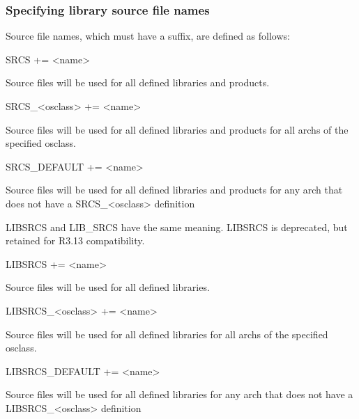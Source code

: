 \subsubsection{Specifying library source file names}

Source file names, which must have a suffix, are defined as follows:

\begin{description}\item {}SRCS += \textless{}name\textgreater{}

\end{description}Source files will be used for all defined libraries and products.

\begin{description}\item SRCS\_\textless{}osclass\textgreater{} += \textless{}name\textgreater{}

\end{description}Source files will be used for all defined libraries and products for all archs of the specified osclass.

\begin{description}\item SRCS\_DEFAULT += \textless{}name\textgreater{}

\end{description}Source files will be used for all defined libraries and products for any arch that does not have a 
SRCS\_\textless{}osclass\textgreater{} definition

LIBSRCS and LIB\_SRCS have the same meaning. LIBSRCS is deprecated, but retained for R3.13 compatibility.

\begin{description}\item {}LIBSRCS += \textless{}name\textgreater{}

\end{description}Source files will be used for all defined libraries.

\begin{description}\item LIBSRCS\_\textless{}osclass\textgreater{} += \textless{}name\textgreater{}

\end{description}Source files will be used for all defined libraries for all archs of the specified osclass.

\begin{description}\item LIBSRCS\_DEFAULT += \textless{}name\textgreater{}

\end{description}Source files will be used for all defined libraries for any arch that does not have a LIBSRCS\_\textless{}osclass\textgreater{} 
definition



